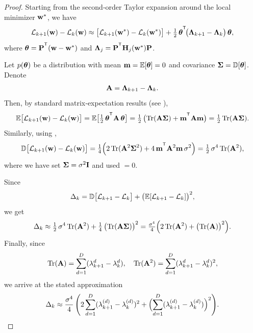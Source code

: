 \documentclass{article}
\begin{document}
\begin{proof}
  Starting from the second‐order Taylor expansion around the local minimizer $\mathbf{w}^*$, we have
  $$
    \cL_{k+1}(\bw) - \cL_k(\bw) \approx
    \bigl[ \cL_{k+1}(\bw^*) - \cL_k(\bw^*) \bigr] + \tfrac12\, \btheta^{\T}\! \bigl( \bLambda_{k+1} - \bLambda_k \bigr)\, \btheta,
  $$
  where $\btheta = \bP^{\T} (\bw-\bw^*)$ and $\bLambda_j = \bP^{\T} \bH_j(\bw^*) \bP$.

  Let $p(\boldsymbol{\theta})$ be a distribution with mean $\mathbf{m}=\mathbb E[\boldsymbol{\theta}] = 0$ and covariance $\boldsymbol{\Sigma} = \mathbb D[\boldsymbol{\theta}]$. Denote
  $$
    \mathbf{A}=\boldsymbol{\Lambda}_{k+1} - \boldsymbol{\Lambda}_k.
  $$
  Then, by standard matrix‐expectation results (see \cite[p. 35]{petersen2012matrix}),
  $$
    \mathbb E \bigl[ \cL_{k+1}(\bw) - \cL_k(\bw) \bigr] =
    \mathbb E \bigl[ \tfrac12\, \btheta^{\T} \bA\, \btheta \bigr] =
    \tfrac12\, \bigl( \tr(\bA \bSigma) + \bm^{\T} \bA \bm \bigr) =
    \tfrac12\, \tr(\bA \bSigma).
  $$
  Similarly, using \cite[p. 43]{petersen2012matrix},
  $$
    \mathbb D \bigl[ \cL_{k+1}(\bw) - \cL_k(\bw) \bigr] =
    \tfrac14 \Bigl( 2\, \tr(\bA^2 \bSigma^2) + 4\, \bm^{\T} \bA^2 \bm\, \sigma^2 \Bigr) =
    \tfrac12\, \sigma^4\, \tr(\bA^2),
  $$
  where we have set $\boldsymbol{\Sigma}=\sigma^2\mathbf I$ and used $\bm=0$.

  Since
  $$
    \Delta_k =
    \mathbb D \bigl[ \mathcal{L}_{k+1} - \mathcal{L}_k \bigr] + \bigl( \mathbb E [\mathcal{L}_{k+1} - \mathcal{L}_k] \bigr)^2,
  $$
  we get
  $$
    \Delta_k \approx
    \tfrac12\, \sigma^4\, \mathrm{Tr}(\mathbf{A}^2) + \tfrac14\, \bigl( \mathrm{Tr}(\mathbf{A} \boldsymbol{\Sigma}) \bigr)^2 =
    \tfrac{\sigma^4}{4} \Bigl( 2\, \mathrm{Tr}(\mathbf{A}^2) + \bigl( \mathrm{Tr}(\mathbf{A}) \bigr)^2 \Bigr).
  $$
  Finally, since
  $$
    \mathrm{Tr}(\mathbf{A}) =
    \sum_{d=1}^D (\lambda_{k+1}^d - \lambda_k^d), \quad
    \mathrm{Tr}(\mathbf{A}^2) =
    \sum_{d=1}^D (\lambda_{k+1}^d - \lambda_k^d)^2,
  $$
  we arrive at the stated approximation
  $$
    \Delta_k \approx
    \frac{\sigma^4}{4}\, \Biggl( 2 \sum_{d=1}^D (\lambda_{k+1}^{(d)} - \lambda_k^{(d)})^2
    + \Bigl( \sum_{d=1}^D (\lambda_{k+1}^{(d)} - \lambda_k^{(d)}) \Bigr)^2 \Biggr).
  $$
\end{proof}
\end{document}
